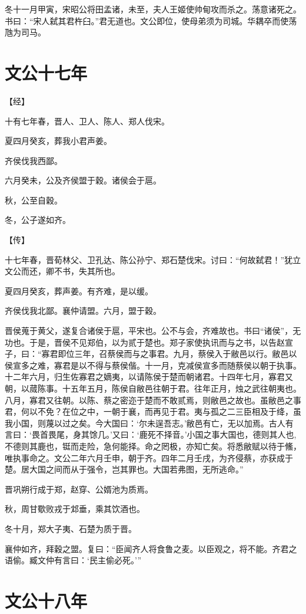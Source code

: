 \documentclass[a4paper,12pt,UTF8,twoside]{ctexbook}
\begin{document}
冬十一月甲寅，宋昭公将田孟诸，未至，夫人王姬使帅甸攻而杀之。荡意诸死之。书曰：“宋人弑其君杵臼。”君无道也。文公即位，使母弟须为司城。华耦卒而使荡虺为司马。

\chapter{文公十七年}



【经】

十有七年春，晋人、卫人、陈人、郑人伐宋。

夏四月癸亥，葬我小君声姜。

齐侯伐我西鄙。

六月癸未，公及齐侯盟于穀。诸侯会于扈。

秋，公至自穀。

冬，公子遂如齐。

【传】

十七年春，晋荀林父、卫孔达、陈公孙宁、郑石楚伐宋。讨曰：“何故弑君！”犹立文公而还，卿不书，失其所也。

夏四月癸亥，葬声姜。有齐难，是以缓。

齐侯伐我北鄙。襄仲请盟。六月，盟于穀。

晋侯蒐于黄父，遂复合诸侯于扈，平宋也。公不与会，齐难故也。书曰“诸侯”，无功也。于是，晋侯不见郑伯，以为贰于楚也。郑子家使执讯而与之书，以告赵宣子，曰：“寡君即位三年，召蔡侯而与之事君。九月，蔡侯入于敝邑以行。敝邑以侯宣多之难，寡君是以不得与蔡侯偕。十一月，克减侯宣多而随蔡侯以朝于执事。十二年六月，归生佐寡君之嫡夷，以请陈侯于楚而朝诸君。十四年七月，寡君又朝，以蒇陈事。十五年五月，陈侯自敝邑往朝于君。往年正月，烛之武往朝夷也。八月，寡君又往朝。以陈、蔡之密迩于楚而不敢贰焉，则敝邑之故也。虽敝邑之事君，何以不免？在位之中，一朝于襄，而再见于君。夷与孤之二三臣相及于绛，虽我小国，则蔑以过之矣。今大国曰：‘尔未逞吾志。’敝邑有亡，无以加焉。古人有言曰：‘畏首畏尾，身其馀几。’又曰：‘鹿死不择音。’小国之事大国也，德则其人也,不德则其鹿也，铤而走险，急何能择。命之罔极，亦知亡矣。将悉敝赋以待于鯈，唯执事命之。文公二年六月壬申，朝于齐。四年二月壬戌，为齐侵蔡，亦获成于楚。居大国之间而从于强令，岂其罪也。大国若弗图，无所逃命。”

晋巩朔行成于郑，赵穿、公婿池为质焉。

秋，周甘歜败戎于邥垂，乘其饮酒也。

冬十月，郑大子夷、石楚为质于晋。

襄仲如齐，拜穀之盟。复曰：“臣闻齐人将食鲁之麦。以臣观之，将不能。齐君之语偷。臧文仲有言曰：‘民主偷必死。’”


\chapter{文公十八年}
\end{document}
